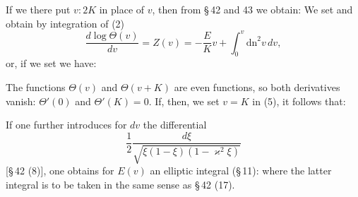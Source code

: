 If we there put $v:2K$ in place of $v$, then from §\,42 and 43 we obtain:
We set
and obtain by integration of (2)
\[ \frac{d\log\Theta(v)}{dv} = Z(v) = -\frac{E}{K}v+\int_0^v \mathrm{dn}^2v\,dv, \]
or, if we set
we have:

The functions $\Theta(v)$ and $\Theta(v+K)$ are even functions, so both derivatives vanish: $\Theta'(0)$
and $\Theta'(K)=0$.
If, then, we set $v=K$ in (5), it follows that:

If one further introduces for $dv$ the differential
\[ \frac{1}{2}\frac{d\xi}{\sqrt{\xi(1-\xi)(1-\varkappa^2\xi)}} \]
[§\,42 (8)], one obtains for $E(v)$ an elliptic integral  (§\,11):
where the latter integral is to be taken in the same sense as §\,42 (17).
